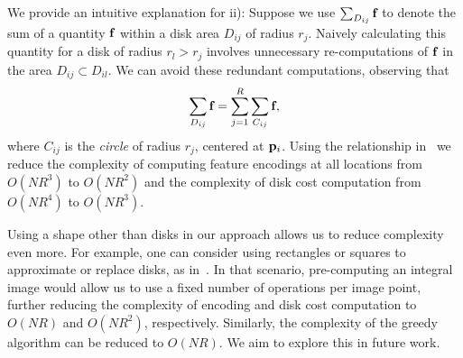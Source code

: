 \documentclass[10pt,twocolumn,letterpaper]{article}
\begin{document}
We provide an intuitive explanation for ii):
Suppose we use $\sum_{D_{ij}} \mathbf{f}_{}$ to denote the sum of a quantity $\mathbf{f}_{}$ within a disk area $D_{ij}$ of radius $r_j$.
Naively calculating this quantity for a disk of radius $r_l > r_j$ involves unnecessary re-computations of $\mathbf{f}_{}$
in the area $D_{ij} \subset D_{il}$.
We can avoid these redundant computations, observing that 
\begin{equation}
\sum_{D_{ij}} \mathbf{f}_{} = \sum_{j=1}^R \sum_{C_{ij}} \mathbf{f}_{}, \label{eq:circlesum}
\end{equation}
where $C_{ij}$ is the \emph{circle} of radius $r_j$, centered at $\mathbf{p}_{i}$.
Using the relationship in~ we reduce the complexity of computing feature encodings at all locations from
$O(NR^3)$ to $O(NR^2)$ and the complexity of disk cost computation from $O(NR^4)$ to $O(NR^3)$.

Using a shape other than disks in our approach allows us to reduce complexity even more.
For example, one can consider using rectangles or squares to approximate or replace disks, 
as in~\cite{arbelaez2011contour,tsogkas2012learning}.
In that scenario, pre-computing an integral image would allow us to use a fixed number of operations per image point, further
reducing the complexity of encoding and disk cost computation to $O(NR)$ and $O(NR^2)$, respectively.
Similarly, the complexity of the greedy algorithm can be reduced to $O(NR)$.
We aim to explore this in future work.



\end{document}
